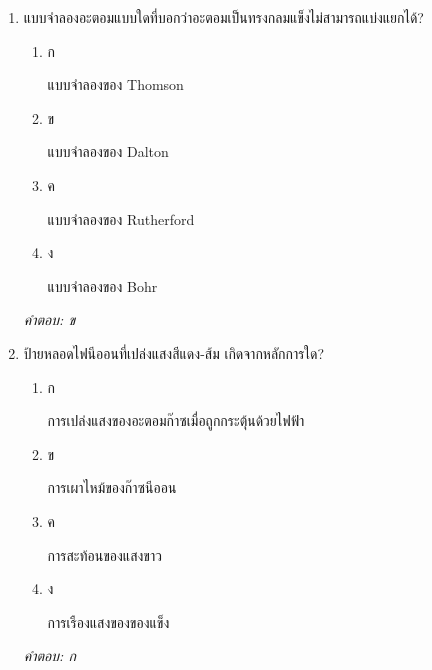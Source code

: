 \documentclass[12pt]{article}
\begin{document}
\begin{enumerate}[label=\arabic*., itemsep=0.5\baselineskip, topsep=0.5\baselineskip, leftmargin=*]
\item แบบจำลองอะตอมแบบใดที่บอกว่าอะตอมเป็นทรงกลมแข็งไม่สามารถแบ่งแยกได้?
\begin{enumerate}[label=\alph*)., itemsep=0.3\baselineskip, topsep=0.3\baselineskip]
\item ก\ 
\begin{minipage}[t]{0.9\linewidth}
\raggedright แบบจำลองของ Thomson
\end{minipage}
\item ข\ 
\begin{minipage}[t]{0.9\linewidth}
\raggedright แบบจำลองของ Dalton
\end{minipage}
\item ค\ 
\begin{minipage}[t]{0.9\linewidth}
\raggedright แบบจำลองของ Rutherford
\end{minipage}
\item ง\ 
\begin{minipage}[t]{0.9\linewidth}
\raggedright แบบจำลองของ Bohr
\end{minipage}
\end{enumerate}
\vspace{-0.3\baselineskip}
\begin{small}
\textit{คำตอบ: ข}
\end{small}

\item ป้ายหลอดไฟนีออนที่เปล่งแสงสีแดง-ส้ม เกิดจากหลักการใด?
\begin{enumerate}[label=\alph*)., itemsep=0.3\baselineskip, topsep=0.3\baselineskip]
\item ก\ 
\begin{minipage}[t]{0.9\linewidth}
\raggedright การเปล่งแสงของอะตอมก๊าซเมื่อถูกกระตุ้นด้วยไฟฟ้า
\end{minipage}
\item ข\ 
\begin{minipage}[t]{0.9\linewidth}
\raggedright การเผาไหม้ของก๊าซนีออน
\end{minipage}
\item ค\ 
\begin{minipage}[t]{0.9\linewidth}
\raggedright การสะท้อนของแสงขาว
\end{minipage}
\item ง\ 
\begin{minipage}[t]{0.9\linewidth}
\raggedright การเรืองแสงของของแข็ง
\end{minipage}
\end{enumerate}
\vspace{-0.3\baselineskip}
\begin{small}
\textit{คำตอบ: ก}
\end{small}


\end{enumerate}
\end{document}
